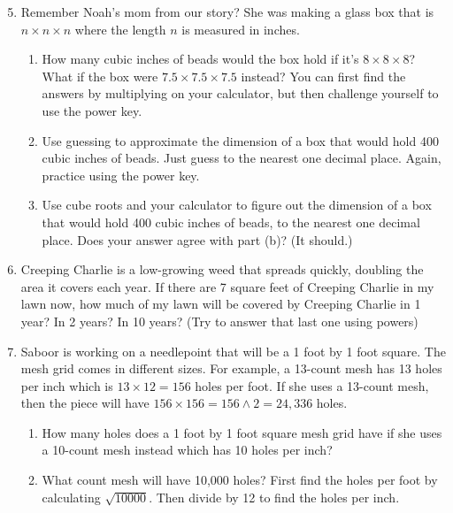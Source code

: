 \begin{enumerate} 
\setcounter{enumi}{4}

\item Remember Noah's mom from our story?  She was making a glass box that is $n \times n \times n$ where the length $n$ is measured in inches.
\begin{enumerate}
\item How many cubic inches of beads would the box hold if it's $8 \times 8 \times 8$? What if the box were $7.5 \times 7.5 \times 7.5$ instead?  You can first find the answers by multiplying on your calculator, but then challenge yourself to use the power key.
\item Use guessing to approximate the dimension of a box that would hold 400 cubic inches of beads. Just guess to the nearest one decimal place. Again, practice using the power key.
\item Use cube roots and your calculator to figure out the dimension of a box that would hold 400 cubic inches of beads, to the nearest one decimal place.  Does your answer agree with part (b)?  (It should.)
\end{enumerate}

\item Creeping Charlie is a low-growing weed that spreads quickly, doubling the area it covers each year.  If there are 7 square feet of Creeping Charlie in my lawn now, how much of my lawn will be covered by Creeping Charlie in 1 year? In 2 years? In 10 years?  (Try to answer that last one using powers)

\item Saboor is working on a needlepoint that will be a 1 foot by 1 foot square.  The mesh grid comes in different sizes.   For example, a 13-count mesh has 13 holes per inch which is $13 \times 12 =  156$ holes per foot. If she uses a 13-count mesh, then the piece will have $156 \times 156 = 156 \land 2 = 24,336$ holes.
\begin{enumerate}
\item How many holes does a 1 foot by 1 foot square mesh grid have if she uses a 10-count mesh instead which has 10 holes per inch? \vfill
\item What count mesh will have 10,000 holes?  First find the holes per foot by calculating $\sqrt{10000}$.  Then divide by 12 to find the holes per inch. \vfill
\end{enumerate}


\end{enumerate}
